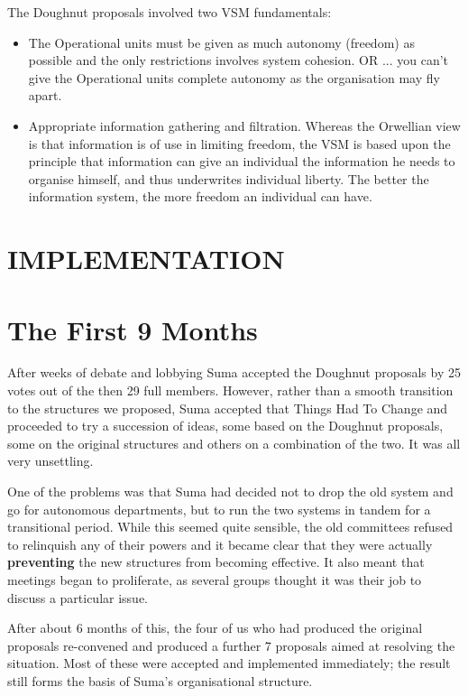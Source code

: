 The Doughnut proposals involved two VSM fundamentals:

\begin{itemize}
  \item The Operational units must be given as much autonomy (freedom) as possible and the only restrictions involves system cohesion. OR ... you can't give the Operational units complete autonomy as the organisation may fly apart.

  \item Appropriate information gathering and filtration. Whereas the Orwellian view is that information is of use in limiting freedom, the VSM is based upon the principle that information can give an individual the information he needs to organise himself, and thus underwrites individual liberty. The better the information system, the more freedom an individual can have.

\end{itemize}

\section*{IMPLEMENTATION}

\section*{The First 9 Months}
After weeks of debate and lobbying Suma accepted the Doughnut proposals by 25 votes out of the then 29 full members. However, rather than a smooth transition to the structures we proposed, Suma accepted that Things Had To Change and proceeded to try a succession of ideas, some based on the Doughnut proposals, some on the original structures and others on a combination of the two. It was all very unsettling.

One of the problems was that Suma had decided not to drop the old system and go for autonomous departments, but to run the two systems in tandem for a transitional period. While this seemed quite sensible, the old committees refused to relinquish any of their powers and it became clear that they were actually \textbf{preventing} the new structures from becoming effective. It also meant that meetings began to proliferate, as several groups thought it was their job to discuss a particular issue.

After about 6 months of this, the four of us who had produced the original proposals re-convened and produced a further 7 proposals aimed at resolving the situation. Most of these were accepted and implemented immediately; the result still forms the basis of Suma's organisational structure.


